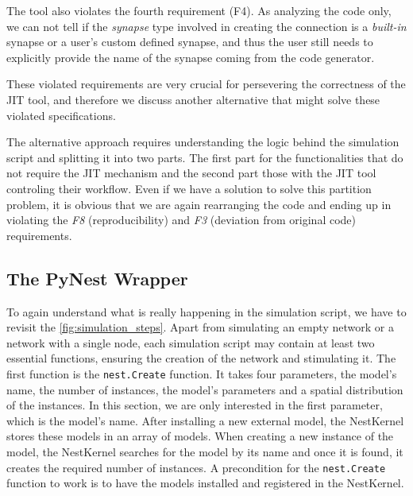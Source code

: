 
The tool also violates the fourth requirement (F4). As analyzing the code only, we can not tell if the \emph{synapse} type involved in creating the connection is a \emph{built-in} synapse or a user's custom defined synapse, and thus the user still  needs to explicitly provide the name of the synapse coming from the code generator. 

These violated requirements are very crucial for persevering the correctness of the JIT tool, and therefore we discuss  another alternative that might solve these violated specifications.


The alternative approach requires understanding the logic behind the simulation script and splitting it into two parts. The first part for the functionalities that do not require the JIT mechanism and the second part those with the JIT tool controling their workflow. Even if we have a solution to solve this partition problem, it is obvious that we are again rearranging the code and ending up in violating the \emph{F8} (reproducibility) and \emph{F3} (deviation from original code) requirements.

\subsection{The PyNest Wrapper}

To again understand what is really happening in the simulation script, we have to revisit the \autoref{fig:simulation_steps}. Apart from simulating an empty network or a network with a single node, each simulation script may contain at least two essential functions, ensuring the creation of the network and stimulating it. The first function is the \texttt{nest.Create} function. It takes four parameters, the model's name, the number of instances, the model's parameters and a spatial distribution of the instances. In this section, we are only interested in the first parameter, which is the model's name. After installing a new external model, the NestKernel stores these models in an array of models. When creating a new instance of the model, the NestKernel searches for the model by its name and once it is found, it creates the required number of instances. A precondition for the \texttt{nest.Create} function to work is to have the models installed and registered in the NestKernel.


